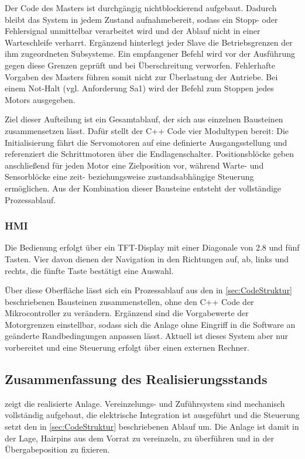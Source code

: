 Der Code des Masters ist durchgängig nichtblockierend aufgebaut. Dadurch bleibt das
System in jedem Zustand aufnahmebereit, sodass ein Stopp- oder Fehlersignal
unmittelbar verarbeitet wird und der Ablauf nicht in einer Warteschleife verharrt.
Ergänzend hinterlegt jeder Slave die Betriebsgrenzen der ihm zugeordneten Subsysteme.
Ein empfangener Befehl wird vor der Ausführung gegen diese Grenzen geprüft und bei
Überschreitung verworfen. Fehlerhafte Vorgaben des Masters führen somit nicht zur
Überlastung der Antriebe. Bei einem Not-Halt (vgl. Anforderung Sa1) wird der Befehl zum Stoppen jedes
Motors ausgegeben.

Ziel dieser Aufteilung ist ein Gesamtablauf, der sich aus einzelnen Bausteinen
zusammensetzen lässt. Dafür stellt der C++ Code vier Modultypen bereit: Die
Initialisierung fährt die Servomotoren auf eine definierte Ausgangsstellung und
referenziert die Schrittmotoren über die Endlagenschalter. Positionsblöcke geben
anschließend für jeden Motor eine Zielposition vor, während Warte- und Sensorblöcke
eine zeit- beziehungsweise zustandsabhängige Steuerung ermöglichen. Aus der
Kombination dieser Bausteine entsteht der vollständige Prozessablauf.

\subsubsection{HMI}\label{sec:HMI}
Die Bedienung erfolgt über ein TFT-Display mit einer Diagonale von \qty{2.8}{\zoll}
und fünf Tasten. Vier davon dienen der Navigation in den Richtungen auf, ab, links und
rechts, die fünfte Taste bestätigt eine Auswahl.

Über diese Oberfläche lässt sich ein Prozessablauf aus den in
\cref{sec:CodeStruktur} beschriebenen Bausteinen zusammenstellen, ohne den C++ Code
der Mikrocontroller zu verändern. Ergänzend sind die Vorgabewerte der Motorgrenzen
einstellbar, sodass sich die Anlage ohne Eingriff in die Software an geänderte
Randbedingungen anpassen lässt. Aktuell ist dieses System aber nur vorbereitet und
eine Steuerung erfolgt über einen externen Rechner.

\subsection{Zusammenfassung des Realisierungsstands}\label{sec:Realisierungsstand}
 zeigt die realisierte Anlage. Vereinzelungs- und Zuführsystem
sind mechanisch vollständig aufgebaut, die elektrische Integration ist ausgeführt und
die Steuerung setzt den in \cref{sec:CodeStruktur} beschriebenen Ablauf um. Die Anlage
ist damit in der Lage, Hairpins aus dem Vorrat zu vereinzeln, zu überführen und in der
Übergabeposition zu fixieren.

